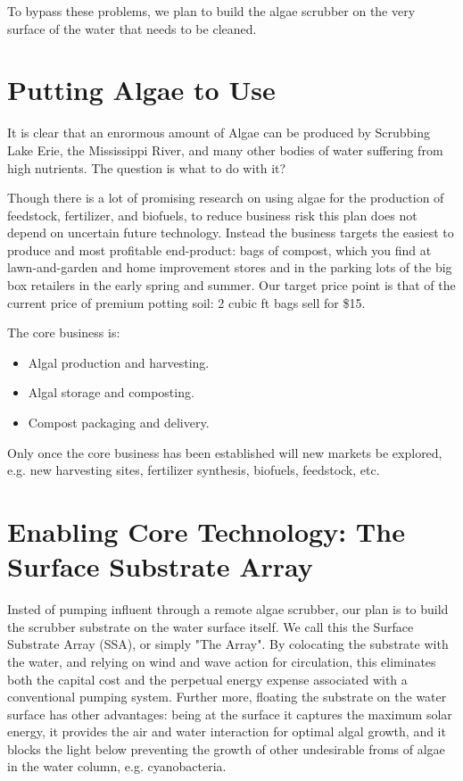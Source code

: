 \documentclass{article}
\begin{document}
To bypass these problems, we plan to build the
algae scrubber on the very surface of the water 
that needs to be cleaned.


\section{Putting Algae to Use}

It is clear that an enrormous amount of Algae
can be produced by Scrubbing
Lake Erie, the Mississippi River, and many
other bodies of water suffering from high nutrients.
The question is what to do with it?

Though there is a lot of promising research on using algae for
the production of feedstock, fertilizer, and biofuels,
to reduce business risk this plan does not depend on
uncertain future technology.
Instead the business targets the easiest to produce
and most profitable end-product: bags of compost, which you find
at lawn-and-garden and home improvement stores and in the
parking lots of the big box retailers in the early spring and summer.
Our target price point is that of the current price of 
premium potting soil: 2 cubic ft bags sell for \$15.

The core business is:
\begin{itemize}
  \item{Algal production and harvesting.}
  \item{Algal storage and composting.}
  \item{Compost packaging and delivery.}
\end{itemize}

Only once the core business has been established
will new markets be explored, e.g. new harvesting sites,
fertilizer synthesis, biofuels, feedstock, etc.

\section{Enabling Core Technology: The Surface Substrate Array}

Insted of pumping influent through a remote algae scrubber,
our plan is to build the scrubber substrate on the water surface itself.
We call this the Surface Substrate Array (SSA), or simply "The Array".
By colocating the substrate with the water, and relying on
wind and wave action for circulation, this eliminates both the capital
cost and the perpetual energy expense associated with a conventional pumping system.
Further more, floating the substrate on the water surface
has other advantages: being at the surface it captures the maximum solar energy,
it provides the air and water interaction for optimal algal growth,
and it blocks the light below preventing the growth of other
undesirable froms of algae in the water column, e.g. cyanobacteria.
\end{document}

